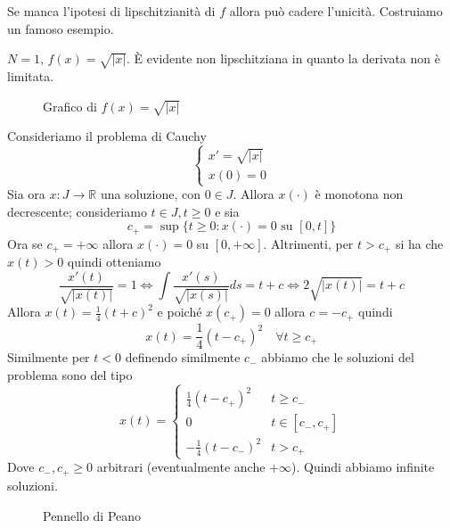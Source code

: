 Se manca l'ipotesi di lipschitzianità di \(f\) allora può cadere l'unicità.
Costruiamo un famoso esempio.
\begin{example}
    \(N = 1\), \(f(x) = \sqrt{|x|}\). È evidente non lipschitziana in quanto la
    derivata non è limitata.
    \begin{figure}[ht]
        \centering
        \caption{Grafico di \(f(x) = \sqrt{|x|}\)}\label{fig:grafico_di_sqrt}
    \end{figure}
    Consideriamo il problema di Cauchy
    \[
        \begin{cases}
            x' = \sqrt{|x|} \\
            x(0) = 0
        \end{cases}
    \]
   Sia ora \(x : J \to \mathbb{R}\) una soluzione, con \(0 \in J\). Allora
   \(x(\cdot )\) è monotona non decrescente; consideriamo \(t \in J, t \ge 0\) e
   sia
   \[
       c_+ = \sup \{t\ge 0 : x(\cdot )= 0 \text{ su } [0, t]\} 
   \]
   Ora se \(c_+ = +\infty\) allora \(x(\cdot ) = 0\) su \([0, +\infty]\).
   Altrimenti, per \(t > c_+\) si ha che \(x(t) > 0\) quindi otteniamo
   \[
       \frac{x'(t)}{\sqrt{|x(t)|}} = 1 \iff \int
       \frac{x'(s)}{\sqrt{|x(s)|}} ds = t + c \iff
       2\sqrt{|x(t)|} = t + c
   \]
   Allora \(\displaystyle x(t) = \frac{1}{4} {(t + c)}^2\) e poiché \(x(c_+) =
   0\) allora \(c = -c_+\) quindi 
   \[
       x(t) = \frac{1}{4} {(t - c_+)}^2 \quad \forall t \ge c_+ 
   \]
   Similmente per \(t < 0 \) definendo similmente \(c_-\) abbiamo che le
   soluzioni del problema sono del tipo
   \[
       x(t) = \begin{cases}
           \frac{1}{4} {(t - c_+)}^2 & t \ge c_- \\
           0 & t \in [c_-, c_+] \\
           -\frac{1}{4} {(t - c_-)}^2 & t > c_+
       \end{cases}
   \]
   Dove \(c_-, c_+ \ge 0\) arbitrari (eventualmente anche \(+\infty\)). Quindi
   abbiamo infinite soluzioni. 
\begin{figure}[ht]
    \centering
    \caption{Pennello di Peano}\label{fig:pennellopeano}
\end{figure}
\end{example}
